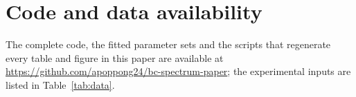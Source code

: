 \documentclass[10pt,twocolumn]{article}
\begin{document}
\section*{Code and data availability}
The complete code, the fitted parameter sets and the scripts that regenerate every table and figure in this paper are available at \url{https://github.com/apoppong24/bc-spectrum-paper}; the experimental inputs are listed in Table~\ref{tab:data}.



\end{document}

